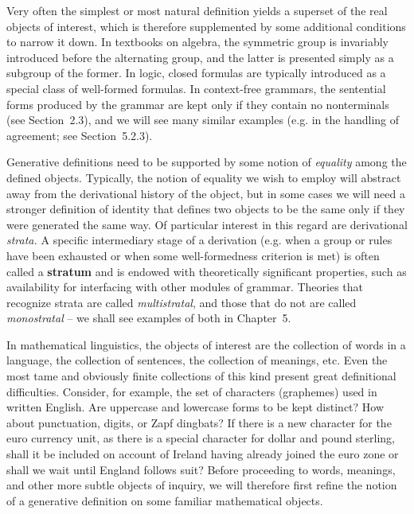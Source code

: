 Very often the simplest or most natural definition yields a superset of the
real objects of interest, which is therefore supplemented by some additional
conditions to narrow it down.  In textbooks on algebra, the symmetric group is
invariably introduced before the alternating group, and the latter is
presented simply as a subgroup of the former. In logic, closed formulas are
typically introduced as a special class of well-formed formulas. In
context-free grammars, the sentential forms produced by the grammar are kept
only if they contain no nonterminals (see Section~2.3), and we will see many
similar examples (e.g. in the handling of agreement; see
Section~5.2.3).

Generative definitions need to be supported by some notion of {\it equality}
among the defined objects.  Typically, the notion of equality we wish to
employ will abstract away from the derivational history of the object, but in
some cases we will need a stronger definition of identity that defines two
objects to be the same only if they were generated the same
way. Of particular interest in
this regard are derivational {\it strata.} A specific intermediary stage of a
derivation (e.g.  when a group or rules have been exhausted or when some
well-formedness criterion is met) is often called a {\bf stratum} and is
endowed with theoretically significant properties, such as availability for
interfacing with other modules of grammar. Theories that recognize strata are
called {\it multistratal}, and those that do not are called {\it monostratal}
-- we shall see examples of both in Chapter~5.  
 

In mathematical linguistics, the objects of interest are the collection of
words in a language, the collection of sentences, the collection of meanings,
etc. Even the most tame and obviously finite collections of this kind present
great definitional difficulties. Consider, for example, the set of characters
(graphemes) used in written English. Are uppercase and lowercase forms to be
kept distinct? How about punctuation, digits, or Zapf dingbats? If there is a
new character for the euro currency unit, as there is a special character for
dollar and pound sterling, shall it be included on account of Ireland having
already joined the euro zone or shall we wait until England follows suit?
Before proceeding to words, meanings, and other more subtle objects of
inquiry, we will therefore first refine the notion of a generative definition
on some familiar mathematical objects.

